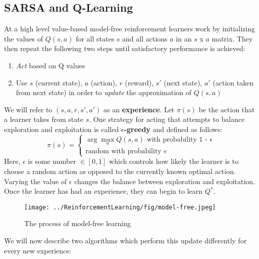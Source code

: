 \subsection{SARSA and Q-Learning}
At a high level value-based model-free reinforcement learners work by initializing the values of $Q(s, a)$ for all states $s$ and all actions $a$ in an $s$ x $a$ matrix. They then repeat the following two steps until satisfactory performance is achieved: 
\begin{enumerate}
    \item \textit{Act} based on Q values
    \item Use $s$ (current state), $a$ (action), $r$ (reward), $s'$ (next state), $a'$ (action taken from next state) in order to \textit{update} the approximation of $Q(s, a)$
\end{enumerate} 
We will refer to $(s, a, r, s', a')$ as an \textbf{experience}. Let $\pi(s)$ be the action that a learner takes from state $s$. One strategy for acting that attempts to balance exploration and exploitation is called $\epsilon$\textbf{-greedy} and defined as follows:
\begin{equation}
    \pi(s) = 
    \begin{cases} 
      \arg\!\max_aQ(s, a) \text{ with probability 1 - }\epsilon \\
      \text{random with probability }\epsilon
    \end{cases}
\end{equation}
Here, $\epsilon$ is some number $\in [0, 1]$ which controls how likely the learner is to choose a random action as opposed to the currently known optimal action. Varying the value of $\epsilon$ changes the balance between exploration and exploitation.\\
Once the learner has had an experience, they can begin to learn $Q^*$. 
\begin{figure}[ht!]
    \centering
    \texttt{[image: ../ReinforcementLearning/fig/model-free.jpeg]}
    \caption{The process of model-free learning}
\end{figure}
We will now describe two algorithms which perform this update differently for every new experience:
